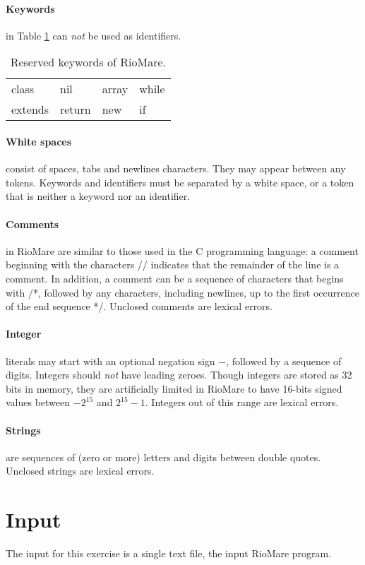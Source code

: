 \documentclass{article}
\begin{document}
\paragraph{Keywords} in Table \ref{Table_Reserved_Keywords_of_RioMare} can \textit{not}
be used as identifiers.
\begin{table}[h]
\centering
\begin{tabular}{ l l l l}
class   & nil    & array  & while \\
extends & return & new    & if    \\
\end{tabular}
\caption{
Reserved keywords of RioMare.
\label{Table_Reserved_Keywords_of_RioMare}}
\end{table}
\paragraph{White spaces} consist of spaces, tabs and newlines
characters. They may appear between any tokens.
Keywords and identifiers must be separated by a white space,
or a token that is neither a keyword nor an identifier.
\paragraph{Comments} in RioMare are similar to those used in the C programming language:
a comment beginning with the characters // indicates that the remainder of the line is a comment.
In addition, a comment can be a sequence of characters that begins with /*,
followed by any characters, including newlines, up to the first occurrence of the end sequence */. Unclosed comments are lexical errors.
\paragraph{Integer} literals may start with an optional negation sign $-$,
followed by a sequence of digits.
Integers should \textit{not} have leading zeroes.
Though integers are stored as 32 bits in memory,
they are artificially limited in RioMare to have
16-bits signed values between $-2^{15}$ and $2^{15}-1$.
Integers out of this range are lexical errors.
\paragraph{Strings} are sequences of (zero or more) letters and digits between double quotes.
Unclosed strings are lexical errors.
\section{Input}
The input for this exercise is a single text file, the input RioMare program.
\end{document}
